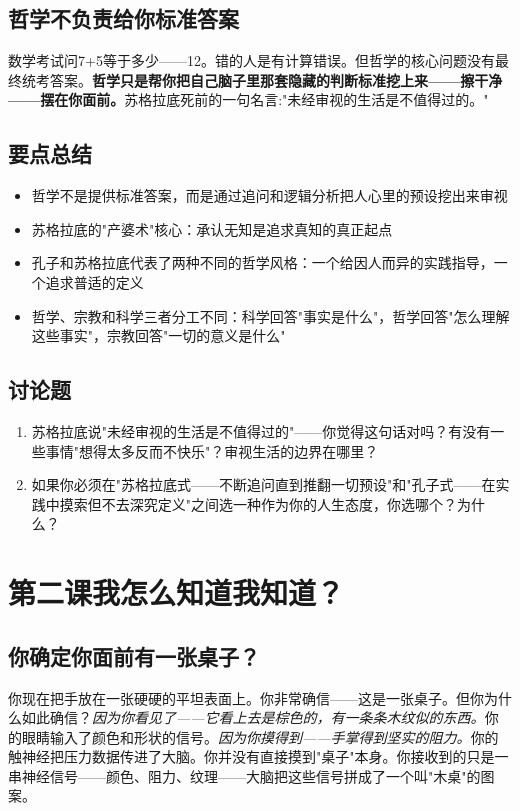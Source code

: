 \documentclass[a4paper,12pt]{ctexart}
\begin{document}
\subsection*{哲学不负责给你标准答案}

数学考试问7+5等于多少——12。错的人是有计算错误。但哲学的核心问题没有最终统考答案。\textbf{哲学只是帮你把自己脑子里那套隐藏的判断标准挖上来——擦干净——摆在你面前。}苏格拉底死前的一句名言:"未经审视的生活是不值得过的。"

\subsection*{要点总结}
\begin{itemize}
  \item 哲学不是提供标准答案，而是通过追问和逻辑分析把人心里的预设挖出来审视
  \item 苏格拉底的"产婆术"核心：承认无知是追求真知的真正起点
  \item 孔子和苏格拉底代表了两种不同的哲学风格：一个给因人而异的实践指导，一个追求普适的定义
  \item 哲学、宗教和科学三者分工不同：科学回答"事实是什么"，哲学回答"怎么理解这些事实"，宗教回答"一切的意义是什么"
\end{itemize}

\subsection*{讨论题}
\begin{enumerate}
  \item 苏格拉底说"未经审视的生活是不值得过的"——你觉得这句话对吗？有没有一些事情"想得太多反而不快乐"？审视生活的边界在哪里？
  \item 如果你必须在"苏格拉底式——不断追问直到推翻一切预设"和"孔子式——在实践中摸索但不去深究定义"之间选一种作为你的人生态度，你选哪个？为什么？
\end{enumerate}

\newpage
\section{\textcolor{orange!80!black}{第二课\quad 我怎么知道我知道？}}

\subsection*{你确定你面前有一张桌子？}

你现在把手放在一张硬硬的平坦表面上。你非常确信——这是一张桌子。但你为什么如此确信？\textit{因为你看见了——它看上去是棕色的，有一条条木纹似的东西。}你的眼睛输入了颜色和形状的信号。\textit{因为你摸得到——手掌得到坚实的阻力。}你的触神经把压力数据传进了大脑。你并没有直接摸到"桌子"本身。你接收到的只是一串神经信号——颜色、阻力、纹理——大脑把这些信号拼成了一个叫"木桌"的图案。
\end{document}
